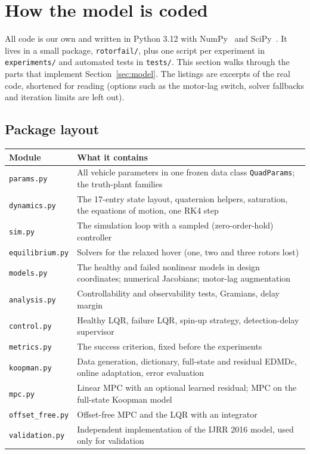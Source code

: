 \section{How the model is coded}\label{sec:code}
All code is our own and written in Python 3.12 with NumPy~\cite{harris2020numpy} and SciPy~\cite{virtanen2020scipy}. It lives in a small package, \texttt{rotorfail/}, plus one script per experiment in \texttt{experiments/} and automated tests in \texttt{tests/}. This section walks through the parts that implement Section~\ref{sec:model}. The listings are excerpts of the real code, shortened for reading (options such as the motor-lag switch, solver fallbacks and iteration limits are left out).

\subsection{Package layout}
\begin{table}[h]
\centering\small
\begin{tabularx}{\linewidth}{l L}
\toprule
Module & What it contains \\
\midrule
\texttt{params.py} & All vehicle parameters in one frozen data class \texttt{QuadParams}; the truth-plant families \\
\texttt{dynamics.py} & The 17-entry state layout, quaternion helpers, saturation, the equations of motion, one RK4 step \\
\texttt{sim.py} & The simulation loop with a sampled (zero-order-hold) controller \\
\texttt{equilibrium.py} & Solvers for the relaxed hover (one, two and three rotors lost) \\
\texttt{models.py} & The healthy and failed nonlinear models in design coordinates; numerical Jacobians; motor-lag augmentation \\
\texttt{analysis.py} & Controllability and observability tests, Gramians, delay margin \\
\texttt{control.py} & Healthy LQR, failure LQR, spin-up strategy, detection-delay supervisor \\
\texttt{metrics.py} & The success criterion, fixed before the experiments \\
\texttt{koopman.py} & Data generation, dictionary, full-state and residual EDMDc, online adaptation, error evaluation \\
\texttt{mpc.py} & Linear MPC with an optional learned residual; MPC on the full-state Koopman model \\
\texttt{offset\_free.py} & Offset-free MPC and the LQR with an integrator \\
\texttt{validation.py} & Independent implementation of the IJRR 2016 model, used only for validation \\
\bottomrule
\end{tabularx}
\end{table}

